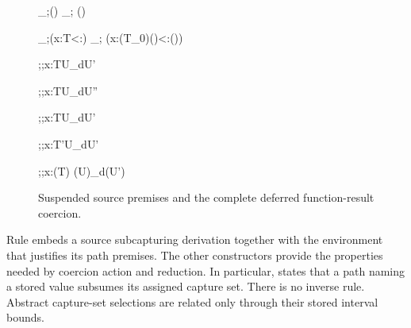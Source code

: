 \documentclass[acmsmall,screen,nonacm]{acmart}
\begin{document}
\begin{figure}[H]
\ContinuedFloat
{}
 {_{\Omega;\sigma}()}
  {_{\Omega;\sigma}
    ()}

 {_{\Omega;\sigma}(x:T\vdash\mu<:\nu)}
  {_{\Omega;\sigma}
    (x:\rho(T_0)\vdash\rho(\mu)<:\rho(\nu))}

 {\Omega;\sigma;x:T\vdash U\rightsquigarrow_{\mathsf d}U'}
\noindent
\begin{minipage}[t]{0.47\linewidth}

  {\Omega;\sigma;x:T\vdash U\rightsquigarrow_{\mathsf d}U''}

  {\Omega;\sigma;x:T\vdash U\rightsquigarrow_{\mathsf d}U'}
\end{minipage}\hfill
\begin{minipage}[t]{0.51\linewidth}
  {\Omega;\sigma;x:T'\vdash U\rightsquigarrow_{\mathsf d}U'}

  {\Omega;\sigma;x:\rho(T)\vdash
    \rho(U)\rightsquigarrow_{\mathsf d}\rho(U')}
\end{minipage}

\caption{Suspended source premises and the complete deferred
function-result coercion.}
\label{fig:deferred-coercions}
\end{figure}

\endgroup

Rule  embeds a source subcapturing derivation together
with the environment that justifies its path premises. The other constructors
provide the properties needed by coercion action and reduction. In
particular,  states that a path naming a stored value
subsumes its assigned capture set. There is no inverse rule.
Abstract capture-set selections are related only through their stored interval
bounds.
\end{document}
